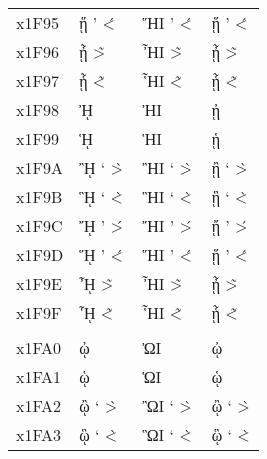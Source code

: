 \documentclass[a4paper]{article}
\newcommand*{\Greek}{\foreignlanguage{greek}}
\newcommand*{\Greek}{\ensuregreek}
\newcommand*{\Cases}[1]{%
  & \Greek{#1} & \Greek{\MakeUppercase{#1}} & \Greek{\MakeLowercase{#1}}
}
\begin{document}
\begin{longtable}{llll}
  x1F95 \Cases{ ᾕ  \accdasiaoxia{\eta}\ypogegrammeni{}          \<'{\eta}\ypogegrammeni{}   \'<{\eta}\ypogegrammeni{}  } \\
  x1F96 \Cases{ ᾖ  \accpsiliperispomeni{\eta}\ypogegrammeni{}   \~>{\eta}\ypogegrammeni{}   \>~{\eta}\ypogegrammeni{}  } \\
  x1F97 \Cases{ ᾗ  \accdasiaperispomeni{\eta}\ypogegrammeni{}   \~<{\eta}\ypogegrammeni{}   \<~{\eta}\ypogegrammeni{}  } \\
  x1F98 \Cases{ ᾘ  \accpsili{\Eta}\ypogegrammeni{}              \>{\Eta}\ypogegrammeni{}                               } \\
  x1F99 \Cases{ ᾙ  \accdasia{\Eta}\ypogegrammeni{}              \<{\Eta}\ypogegrammeni{}                               } \\
  x1F9A \Cases{ ᾚ  \accpsilivaria{\Eta}\ypogegrammeni{}         \>`{\Eta}\ypogegrammeni{}   \`>{\Eta}\ypogegrammeni{}  } \\
  x1F9B \Cases{ ᾛ  \accdasiavaria{\Eta}\ypogegrammeni{}         \<`{\Eta}\ypogegrammeni{}   \`<{\Eta}\ypogegrammeni{}  } \\
  x1F9C \Cases{ ᾜ  \accpsilioxia{\Eta}\ypogegrammeni{}          \>'{\Eta}\ypogegrammeni{}   \'>{\Eta}\ypogegrammeni{}  } \\
  x1F9D \Cases{ ᾝ  \accdasiaoxia{\Eta}\ypogegrammeni{}          \<'{\Eta}\ypogegrammeni{}   \'<{\Eta}\ypogegrammeni{}  } \\
  x1F9E \Cases{ ᾞ  \accpsiliperispomeni{\Eta}\ypogegrammeni{}   \~>{\Eta}\ypogegrammeni{}   \>~{\Eta}\ypogegrammeni{}  } \\
  x1F9F \Cases{ ᾟ  \accdasiaperispomeni{\Eta}\ypogegrammeni{}   \~<{\Eta}\ypogegrammeni{}   \<~{\Eta}\ypogegrammeni{}  } \\
                                                                                                                         \\
  x1FA0 \Cases{ ᾠ  \accpsili{\omega}\ypogegrammeni{}            \>{\omega}\ypogegrammeni{}                             } \\
  x1FA1 \Cases{ ᾡ  \accdasia{\omega}\ypogegrammeni{}            \<{\omega}\ypogegrammeni{}                             } \\
  x1FA2 \Cases{ ᾢ  \accpsilivaria{\omega}\ypogegrammeni{}       \>`{\omega}\ypogegrammeni{} \`>{\omega}\ypogegrammeni{}} \\
  x1FA3 \Cases{ ᾣ  \accdasiavaria{\omega}\ypogegrammeni{}       \<`{\omega}\ypogegrammeni{} \`<{\omega}\ypogegrammeni{}} \\

\end{longtable}
\end{document}
